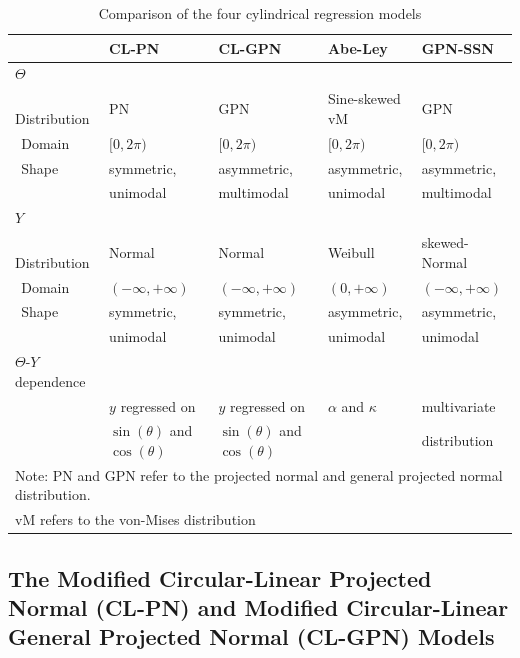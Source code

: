\documentclass[man,mask]{apa6}
\begin{document}
\begin{table}
\centering
\caption{Comparison of the four cylindrical regression models} 
\begin{tabular}{lllll}
  \noalign{\smallskip}\hline\noalign{\smallskip}
\multicolumn{1}{l}{Aspect} & CL-PN & CL-GPN  & Abe-Ley  & GPN-SSN \\ \hline\noalign{\smallskip}
$\Theta$ & &&&\\
$\:\:$Distribution& PN & GPN & Sine-skewed vM & GPN\\
$\:\:$Domain & $[0, 2\pi)$ & $[0, 2\pi)$ & $[0, 2\pi)$ & $[0, 2\pi)$\\
$\:\:$Shape & symmetric, & asymmetric, & asymmetric, & asymmetric, \\
            & unimodal  & multimodal & unimodal   & multimodal \\\hline\noalign{\smallskip}
$Y$& &&&\\
$\:\:$Distribution & Normal & Normal & Weibull & skewed-Normal\\
$\:\:$Domain & $(-\infty, + \infty)$ & $(-\infty, + \infty)$ & $(0, + \infty)$ & $(-\infty, + \infty)$\\
$\:\:$Shape & symmetric, & symmetric, & asymmetric, & asymmetric, \\
            & unimodal  & unimodal  & unimodal   & unimodal\\\hline\noalign{\smallskip}
$\Theta$-$Y$ dependence &                                   &                                   & & \\
                        & $y$ regressed on                  & $y$ regressed on                  & $\alpha$ and $\kappa$ & multivariate \\
                        & $\sin(\theta)$ and $\cos(\theta)$ & $\sin(\theta)$ and $\cos(\theta)$ & & distribution\\\hline
\multicolumn{5}{l}{Note: PN and GPN refer to the projected normal and general projected normal distribution.}\\
\multicolumn{5}{l}{vM refers to the von-Mises distribution}\\

\end{tabular}
\label{TableModels}
\end{table}

\vspace{-0.75cm}
\subsection{The Modified Circular-Linear Projected Normal (CL-PN) and Modified Circular-Linear General Projected Normal (CL-GPN) Models}\label{CL-(G)PN}
\vspace{-0.75cm}
\end{document}

